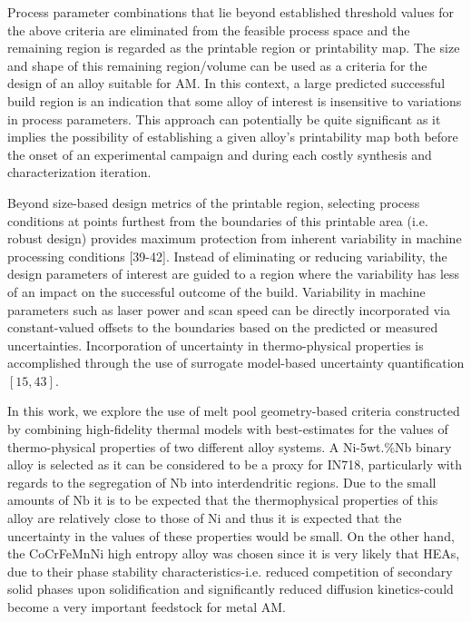 \documentclass[10pt]{article}
\begin{document}
Process parameter combinations that lie beyond established threshold values for the above criteria are eliminated from the feasible process space and the remaining region is regarded as the printable region or printability map. The size and shape of this remaining region/volume can be used as a criteria for the design of an alloy suitable for AM. In this context, a large predicted successful build region is an indication that some alloy of interest is insensitive to variations in process parameters. This approach can potentially be quite significant as it implies the possibility of establishing a given alloy's printability map both before the onset of an experimental campaign and during each costly synthesis and characterization iteration.

Beyond size-based design metrics of the printable region, selecting process conditions at points furthest from the boundaries of this printable area (i.e. robust design) provides maximum protection from inherent variability in machine processing conditions [39-42]. Instead of eliminating or reducing variability, the design parameters of interest are guided to a region where the variability has less of an impact on the successful outcome of the build. Variability in machine parameters such as laser power and scan speed can be directly incorporated via constant-valued offsets to the boundaries based on the predicted or measured uncertainties. Incorporation of uncertainty in thermo-physical properties is accomplished through the use of surrogate model-based uncertainty quantification $[15,43]$.

In this work, we explore the use of melt pool geometry-based criteria constructed by combining high-fidelity thermal models with best-estimates for the values of thermo-physical properties of two different alloy systems. A Ni-5wt.\%Nb binary alloy is selected as it can be considered to be a proxy for IN718, particularly with regards to the segregation of $\mathrm{Nb}$ into interdendritic regions. Due to the small amounts of $\mathrm{Nb}$ it is to be expected that the thermophysical properties of this alloy are relatively close to those of $\mathrm{Ni}$ and thus it is expected that the uncertainty in the values of these properties would be small. On the other hand, the CoCrFeMnNi high entropy alloy was chosen since it is very likely that HEAs, due to their phase stability characteristics-i.e. reduced competition of secondary solid phases upon solidification and significantly reduced diffusion kinetics-could become a very important feedstock for metal AM.
\end{document}
